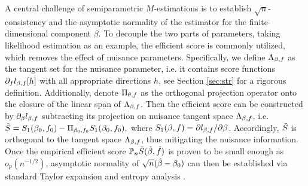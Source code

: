 A central challenge of semiparametric $M$-estimations is to establish \( \sqrt{n} \)-consistency and the asymptotic normality of the estimator for the finite-dimensional component \( \beta \). 
To decouple the two parts of parameters, taking likelihood estimation as an example, the efficient score is commonly utilized, which removes the effect of nuisance parameters.
Specifically, we define $\Lambda_{\beta,f}$ as the tangent set for the nuisance parameter, i.e. it contains score functions $\partial_{f} l_{\beta,f}[h]$ with all appropriate directions $h$, see Section \ref{sec:str} for a rigorous definition. 
Additionally, denote $\Pi_{\theta, f}$ as the orthogonal projection operator onto the closure of the linear span of $\Lambda_{\beta,f}$. 
Then the efficient score can be constructed by $\partial_{\beta} l_{\beta,f}$ subtracting its projection on nuisance tangent space $\Lambda_{\beta,f}$, i.e. 
$\tilde{S}=S_1(\beta_{0}, f_{0})-\Pi_{\beta_{0}, f_{0}} S_1(\beta_{0}, f_{0}), $
where 
$S_1(\beta, f) = 
\partial l_{\beta, f}/\partial \beta $.
Accordingly, $\tilde{S}$ is orthogonal to the tangent space $\Lambda_{\beta,f}$, thus mitigating the nuisance information.
Once the empirical efficient score $\mathbb{P}_{n} \tilde{S}(\hat{\beta}, \hat{f})$ is proven to be small enough as $o_p(n^{-1/2})$, asymptotic normality of $\sqrt{n}(\hat{\beta} - \beta_{0})$ can then be established via standard Taylor expansion and entropy analysis \citep{van2000asymptotic,kosorok2008introduction}. 


